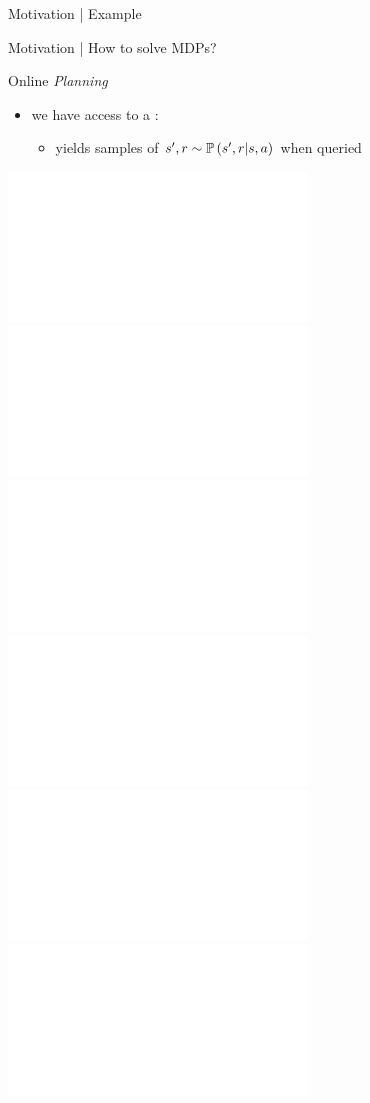 \documentclass{beamer}
\newcommand{\vcenteredinclude}[2]{\begingroup
\setbox0=\hbox{}%
\parbox{\wd0}{\box0}\endgroup}
\begin{document}
\begin{frame}{Motivation | Example}
\end{frame}

\begin{frame}{Motivation | How to solve MDPs?}
\begin{exampleblock}{Online \emph{Planning}}
\begin{itemize}
    \item we have access to a : 
    \begin{itemize}
        \item[\incarrow] yields samples of $s', r \sim \mathbb{P}\left(s',r|s,a\right)$ when queried
    \end{itemize}
\end{itemize}
\begin{center}
    \includegraphics<1>[trim=0 25 0 50,clip, width=0.7\linewidth]{img/diagram2.pdf}
    \includegraphics<2>[trim=0 25 0 50,clip, width=0.7\linewidth]{img/diagram3.pdf}
    \includegraphics<3>[trim=0 25 0 50,clip, width=0.7\linewidth]{img/diagram4.pdf}
    \includegraphics<4>[trim=0 25 0 50,clip, width=0.7\linewidth]{img/diagram5.pdf}
    \includegraphics<5>[trim=0 25 0 50,clip, width=0.7\linewidth]{img/diagram6.pdf}
    \includegraphics<6>[trim=0 25 0 50,clip, width=0.7\linewidth]{img/diagram7.pdf}
\end{center}
\end{exampleblock}
\end{frame}
\end{document}
